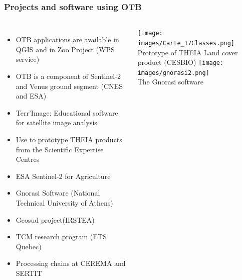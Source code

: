 \documentclass[8pt]{beamer}
\begin{document}
\begin{frame}
  \frametitle{Projects and software using OTB}
  \vspace{-0.5cm}
\begin{columns}
  \begin{itemize}
    \item OTB applications are available in QGIS and in Zoo Project (WPS service)
    \item OTB is a component of \alert{Sentinel-2} and Venus ground segment (CNES and ESA)
    \item Terr'Image: Educational software for satellite image analysis
    \item Use to prototype \alert{THEIA} products from the Scientific Expertise Centres
    \item ESA Sentinel-2 for Agriculture
    \item Gnorasi Software (National Technical University of Athens)
    \item Geosud project(IRSTEA)
    \item TCM research program (ETS Quebec)
    \item Processing chains at CEREMA and SERTIT
  \end{itemize}
  \begin{center}
  \texttt{[image: images/Carte\_17Classes.png]}\\
  \tiny{Prototype of THEIA Land cover product (CESBIO)}
  \texttt{[image: images/gnorasi2.png]}\\
  \tiny{The Gnorasi software}
  \end{center}
\end{columns}
\end{frame}
\end{document}
